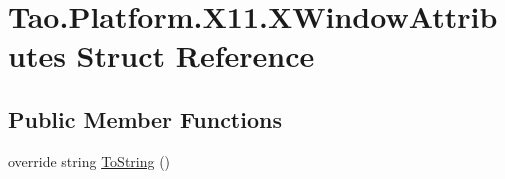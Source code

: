\hypertarget{struct_tao_1_1_platform_1_1_x11_1_1_x_window_attributes}{
\section{Tao.Platform.X11.XWindowAttributes Struct Reference}
\label{struct_tao_1_1_platform_1_1_x11_1_1_x_window_attributes}
}
\subsection*{Public Member Functions}
\begin{DoxyCompactItemize}
\item 
override string \hyperlink{struct_tao_1_1_platform_1_1_x11_1_1_x_window_attributes_aa1097ca6cd623a686368d704bad19e05}{ToString} ()
\end{DoxyCompactItemize}
